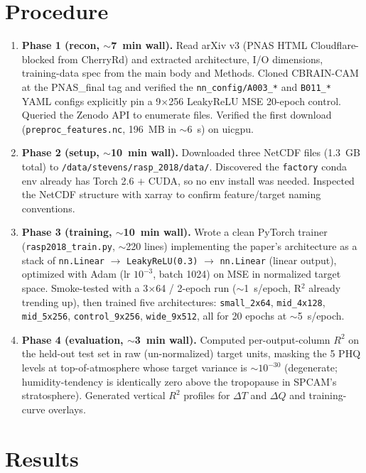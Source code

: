 \documentclass[11pt]{article}
\begin{document}
\section{Procedure}
\begin{enumerate}
\item \textbf{Phase 1 (recon, $\sim$7~min wall).} Read arXiv v3 (PNAS HTML
  Cloudflare-blocked from CherryRd) and extracted architecture, I/O
  dimensions, training-data spec from the main body and Methods. Cloned
  CBRAIN-CAM at the PNAS\_final tag and verified the
  \texttt{nn\_config/A003\_*} and \texttt{B011\_*} YAML configs explicitly
  pin a 9$\times$256 LeakyReLU MSE 20-epoch control. Queried the Zenodo
  API to enumerate files. Verified the first download
  (\texttt{preproc\_features.nc}, 196~MB in $\sim$6~s) on uicgpu.
\item \textbf{Phase 2 (setup, $\sim$10~min wall).} Downloaded three NetCDF
  files (1.3~GB total) to \texttt{/data/stevens/rasp\_2018/data/}.
  Discovered the \texttt{factory} conda env already has Torch 2.6 $+$
  CUDA, so no env install was needed. Inspected the NetCDF structure with
  xarray to confirm feature/target naming conventions.
\item \textbf{Phase 3 (training, $\sim$10~min wall).} Wrote a clean
  PyTorch trainer (\texttt{rasp2018\_train.py}, $\sim$220 lines)
  implementing the paper's architecture as a stack of
  \texttt{nn.Linear} $\to$ \texttt{LeakyReLU(0.3)} $\to$ \texttt{nn.Linear}
  (linear output), optimized with Adam (lr $10^{-3}$, batch 1024) on MSE
  in normalized target space. Smoke-tested with a 3$\times$64 / 2-epoch run
  ($\sim$1~s/epoch, R$^2$ already trending up), then trained five
  architectures: \texttt{small\_2x64}, \texttt{mid\_4x128},
  \texttt{mid\_5x256}, \texttt{control\_9x256}, \texttt{wide\_9x512}, all
  for 20 epochs at $\sim$5~s/epoch.
\item \textbf{Phase 4 (evaluation, $\sim$3~min wall).} Computed per-output-column
  $R^2$ on the held-out test set in raw (un-normalized) target units, masking
  the 5 PHQ levels at top-of-atmosphere whose target variance is $\sim 10^{-30}$
  (degenerate; humidity-tendency is identically zero above the tropopause in
  SPCAM's stratosphere). Generated vertical $R^2$ profiles for $\Delta T$ and
  $\Delta Q$ and training-curve overlays.
\end{enumerate}

\section{Results}
\end{document}
